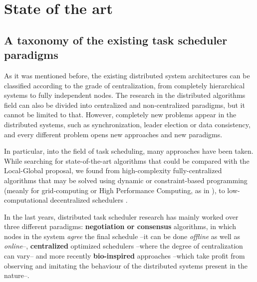 
\chapter{State of the art} %

\label{Chapter2} %


\section{A taxonomy of the existing task scheduler paradigms}

As it was mentioned before, the existing distributed system architectures can be classified according to the grade of centralization, from completely hierarchical systems to fully independent nodes. The research in the distributed algorithms field can also be divided into centralized and non-centralized paradigms, but it cannot be limited to that. However, completely new problems appear in the distributed systems, such as synchronization, leader election or data consistency,  and every different problem opens new approaches and new paradigms.

In particular, into the field of task scheduling, many approaches have been taken. While searching for state-of-the-art algorithms that could be compared with the Local-Global proposal, we found from high-complexity fully-centralized algorithms that may be solved using dynamic or constraint-based programming (meanly for grid-computing or High Performance Computing, as in \cite{anderson2005high,ramamritham1984dynamic,yu2005taxonomy}), to low-computational decentralized schedulers \citep{1310996,zhu2007tasks}.

In the last years, distributed task scheduler research has mainly worked over three different paradigms: \textbf{negotiation or consensus} algorithms, in which nodes in the system \emph{agree} the final schedule --it can be done \emph{offline} as well as \emph{online}--, \textbf{centralized} optimized schedulers --where the degree of centralization can vary-- and more recently \textbf{bio-inspired} approaches --which take profit from observing and imitating the behaviour of the distributed systems present in the nature--.

